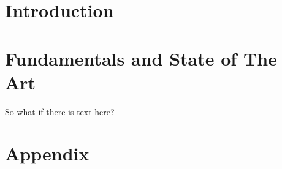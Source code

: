 \documentclass[10pt,twoside]{report}
\title{\thesisTitle}
\author{\thesisAuthor}
\date{\today}
\begin{document}
%



\tableofcontents{}

\chapter{Introduction}

\chapter{Fundamentals and State of The Art}


So what if there is text here?
% 
% 
% 
% 

\newpage
\appendix{}
\chapter{Appendix}


\listoffigures{}
\listoftables{}

\nocite{*}
\printbibliography{}

\newpage{}
\end{document}
